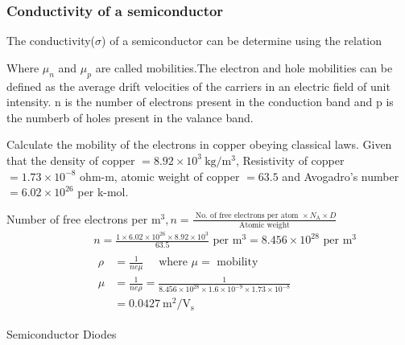 \subsubsection{Conductivity of a semiconductor}
The conductivity($\sigma$) of a semiconductor can be determine using the relation
\begin{center}
\end{center}
Where $\mu_n$ and $\mu_p$ are called mobilities.The electron and hole mobilities can be defined as the average drift velocities of the carriers in an electric field of unit intensity. n is the number of electrons present in the conduction band and p is the numberb of holes present in the valance band.
\begin{exercise}
	Calculate the mobility of the electrons in copper obeying classical laws. Given that the density of copper $=8.92 \times 10^{3} \mathrm{~kg} / \mathrm{m}^{3}$, Resistivity of copper $=1.73 \times 10^{-8}$ ohm-m, atomic weight of copper $=63.5$ and Avogadro's number $=6.02 \times 10^{26}$ per k-mol.
\end{exercise}
\begin{answer}
	Number of free electrons per $\mathrm{m}^{3}, n=\frac{\text { No. of free electrons per atom } \times N_{\mathrm{A}} \times D}{\text { Atomic weight }}$
	$$
	\begin{aligned}
	&\qquad n=\frac{1 \times 6.02 \times 10^{26} \times 8.92 \times 10^{3}}{63.5} \text { per } \mathrm{m}^{3}=8.456 \times 10^{28} \text { per } \mathrm{m}^{3} \\
	&\qquad \begin{aligned}
	\rho &=\frac{1}{n e \mu} \quad \text { where } \mu=\text { mobility } \\
	\mu &=\frac{1}{n e \rho}=\frac{1}{8.456 \times 10^{28} \times 1.6 \times 10^{-9} \times 1.73 \times 10^{-8}} \\
	&=0.0427 \mathrm{~m}^{2} / \mathrm{V}_{\mathrm{s}}
	\end{aligned}
	\end{aligned}
	$$
\end{answer}
\newpage
\begin{abox}
	Semiconductor Diodes
\end{abox}
